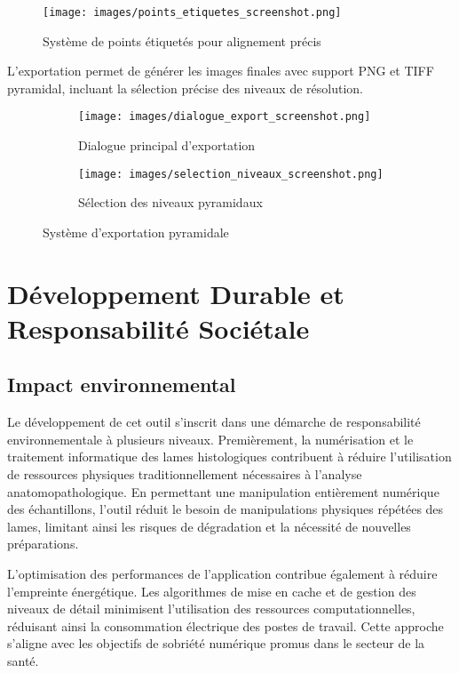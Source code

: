 \documentclass[12pt,a4paper]{report}
\let\oldchapter\chapter
\renewcommand{\chapter}{\clearpage\oldchapter}
\begin{document}
\begin{figure}[H]
\centering
\texttt{[image: images/points\_etiquetes\_screenshot.png]}
\caption{Système de points étiquetés pour alignement précis}
\label{fig:points_etiquetes}
\end{figure}

L'exportation permet de générer les images finales avec support PNG et TIFF pyramidal, incluant la sélection précise des niveaux de résolution.

\begin{figure}[H]
\centering
\begin{subfigure}{0.48\textwidth}
\texttt{[image: images/dialogue\_export\_screenshot.png]}
\caption{Dialogue principal d'exportation}
\end{subfigure}
\hfill
\begin{subfigure}{0.48\textwidth}
\texttt{[image: images/selection\_niveaux\_screenshot.png]}
\caption{Sélection des niveaux pyramidaux}
\end{subfigure}
\caption{Système d'exportation pyramidale}
\label{fig:export_pyramidal}
\end{figure}

\chapter{Développement Durable et Responsabilité Sociétale}

\clearpage

\section{Impact environnemental}

Le développement de cet outil s'inscrit dans une démarche de responsabilité environnementale à plusieurs niveaux. Premièrement, la numérisation et le traitement informatique des lames histologiques contribuent à réduire l'utilisation de ressources physiques traditionnellement nécessaires à l'analyse anatomopathologique. En permettant une manipulation entièrement numérique des échantillons, l'outil réduit le besoin de manipulations physiques répétées des lames, limitant ainsi les risques de dégradation et la nécessité de nouvelles préparations.

L'optimisation des performances de l'application contribue également à réduire l'empreinte énergétique. Les algorithmes de mise en cache et de gestion des niveaux de détail minimisent l'utilisation des ressources computationnelles, réduisant ainsi la consommation électrique des postes de travail. Cette approche s'aligne avec les objectifs de sobriété numérique promus dans le secteur de la santé.
\end{document}
